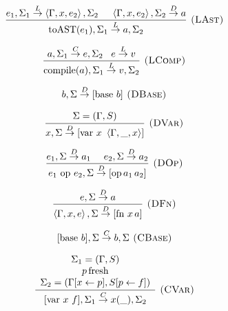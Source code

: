 \documentclass[english]{llncs}
\begin{document}
\begin{figure}[t!]
\begin{minipage}[t]{0.59\columnwidth}
{\footnotesize{}
\[
\frac{e_{1},\Sigma_{1}\overset{L}{\rightarrow}\left\langle \Gamma,x,e_{2}\right\rangle ,\Sigma_{2}\,\,\,\,\,\,\,\,\left\langle \Gamma,x,e_{2}\right\rangle ,\Sigma_{2}\overset{D}{\rightarrow}a}{\mbox{toAST(\ensuremath{e_{1}})},\Sigma_{1}\overset{L}{\rightarrow}a,\Sigma_{2}}\textsc{ (LAst)}
\]
}{\footnotesize \par}

{\footnotesize{}
\[
\frac{a,\Sigma_{1}\overset{C}{\rightarrow}e,\Sigma_{2}\,\,\,\,\, e\overset{L}{\rightarrow}v}{\mbox{compile(\ensuremath{a})},\Sigma_{1}\overset{L}{\rightarrow}v,\Sigma_{2}}\textsc{ (LComp)}
\]
}%
\end{minipage}{\footnotesize{}}%
\begin{minipage}[t]{0.4\columnwidth}%
{\footnotesize{}
\[
b,\Sigma\overset{D}{\rightarrow}[\mbox{base }b]\textsc{ (DBase)}
\]
}{\footnotesize \par}

{\footnotesize{}
\[
\frac{\begin{array}[t]{c}
\Sigma=(\Gamma,S)\end{array}}{x,\Sigma\overset{D}{\rightarrow}[\mbox{var}\ x\ \left\langle \Gamma,\_,x\right\rangle ]}\textsc{ (DVar)}
\]
}{\footnotesize \par}

{\footnotesize{}
\[
\frac{e_{1},\Sigma\overset{D}{\rightarrow}a_{1}\,\,\,\,\,\,\,\, e_{2},\Sigma\overset{D}{\rightarrow}a_{2}}{e_{1}\mbox{ op }e_{2},\Sigma\overset{D}{\rightarrow}[\mbox{op\,\ensuremath{a_{1}\,}\ensuremath{a_{2}}}]}\textsc{ (DOp)}
\]
}{\footnotesize \par}

{\footnotesize{}
\[
\frac{e,\Sigma\overset{D}{\rightarrow}a}{\left\langle \Gamma,x,e\right\rangle ,\Sigma\overset{D}{\rightarrow}[\mbox{fn }x\, a]}\textsc{ (DFn)}
\]
}{\footnotesize \par}

{\footnotesize{}
\[
[\mbox{base \ensuremath{b}}],\Sigma\overset{C}{\rightarrow}b,\Sigma\textsc{ (CBase)}
\]
}{\footnotesize \par}

{\footnotesize{}
\[
\frac{\begin{array}[t]{c}
\Sigma_{1}=(\Gamma,S)\\
p\,\mbox{fresh}\\
\Sigma_{2}=(\Gamma[x\leftarrow p],S[p\leftarrow f])
\end{array}}{[\mbox{var}\ x\ f],\Sigma_{1}\overset{C}{\rightarrow}x(\_),\Sigma_{2}}\textsc{ (CVar)}
\]
}{\footnotesize \par}


\end{minipage}
\end{figure}
\end{document}
